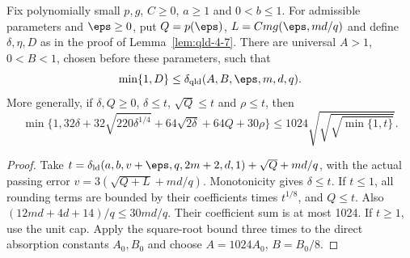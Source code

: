 \begin{theorem}
\label{thm:qld-actual-rounded-error-bound}
\leanok
Fix polynomially small $p,g$, $C\geq0$, $a\geq1$ and $0<b\leq1$.
For admissible parameters and $\eps\geq0$, put $Q=p(\eps)$,
$L=Cm g(\eps,md/q)$ and define $\delta,\eta,D$ as in the proof of
Lemma~\ref{lem:qld-4-7}. There are universal $A>1$, $0<B<1$, chosen
before these parameters, such that
\[
 \min\{1,D\}\leq\delta_{\rm qld}(A,B,\eps,m,d,q).
\]
More generally, if $\delta,Q\geq0$, $\delta\leq t$, $\sqrt Q\leq t$ and
$\rho\leq t$, then
\[
 \min\{1,32\delta+32\sqrt{220\delta^{1/4}}+
 64\sqrt{2\delta}+64Q+30\rho\}
 \leq1024\sqrt{\sqrt{\sqrt{\min\{1,t\}}}}.
\]
\end{theorem}
\begin{proof}
\leanok
{}
Take $t=\delta_{\rm ld}(a,b,v+\eps,q,2m+2,d,1)+\sqrt Q+md/q$,
with the actual passing error $v=3(\sqrt{Q+L}+md/q)$.
Monotonicity gives $\delta\leq t$. If $t\leq1$, all rounding terms
are bounded by their coefficients times $t^{1/8}$, and $Q\leq t$.
Also $(12md+4d+14)/q\leq30md/q$. Their coefficient sum is at most 1024.
If $t\geq1$, use the unit cap. Apply the square-root bound three times
to the direct absorption constants $A_0,B_0$ and choose
$A=1024A_0$, $B=B_0/8$.
\end{proof}
